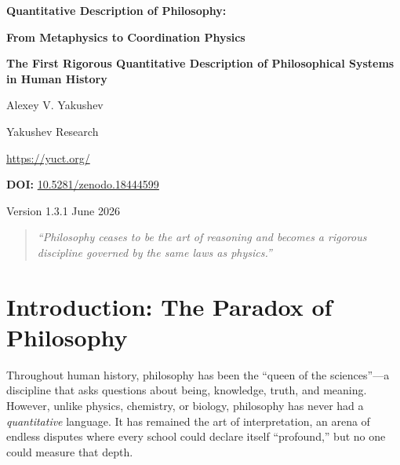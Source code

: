 \documentclass[12pt,a4paper]{article}
\begin{document}
	
	\begin{titlepage}
		\begin{center}
			\vspace*{1cm}
			{\Huge\bfseries\color{darkblue} Quantitative Description of Philosophy: \par}
			\vspace{0.3cm}
			{\Huge\bfseries\color{darkblue} From Metaphysics to Coordination Physics\par}
			\vspace{1cm}
			{\Large\bfseries The First Rigorous Quantitative Description of Philosophical Systems in Human History\par}
			\vspace{1.5cm}
			{\large Alexey V. Yakushev\par}
			{\large Yakushev Research\par}
			{\large \url{https://yuct.org/}\par}
			\vspace{1cm}
			{\large \textbf{DOI:} \href{https://doi.org/10.5281/zenodo.18444599}{10.5281/zenodo.18444599}\par}
			\vspace{1cm}
			{\large Version 1.3.1 \quad June 2026\par}
			\vfill
			\begin{quote}
				\itshape
				``Philosophy ceases to be the art of reasoning and becomes a rigorous discipline governed by the same laws as physics.''
			\end{quote}
		\end{center}
	\end{titlepage}
	
	\tableofcontents
	\newpage
	
	\section{Introduction: The Paradox of Philosophy}
	
	Throughout human history, philosophy has been the ``queen of the sciences''—a discipline that asks questions about being, knowledge, truth, and meaning. However, unlike physics, chemistry, or biology, philosophy has never had a \emph{quantitative} language. It has remained the art of interpretation, an arena of endless disputes where every school could declare itself ``profound,'' but no one could measure that depth.
	
\end{document}
